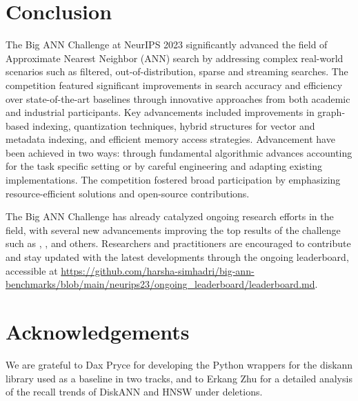 \section{Conclusion}
\label{sec:conclusion}

The Big ANN Challenge at NeurIPS 2023 significantly advanced the field of Approximate Nearest Neighbor (ANN) search by addressing complex real-world scenarios such as filtered, out-of-distribution, sparse and streaming searches. The competition featured significant improvements in search accuracy and efficiency over state-of-the-art baselines through innovative approaches from both academic and industrial participants. 
Key advancements included improvements in graph-based indexing, quantization techniques, hybrid structures for vector and metadata indexing, and efficient memory access strategies. 
Advancement have been achieved in two ways: through fundamental algorithmic advances accounting for the task specific setting or by careful engineering and adapting existing implementations.
The competition fostered broad participation by emphasizing resource-efficient solutions and open-source contributions.





The Big ANN Challenge has already catalyzed ongoing research efforts in the field, with several new advancements improving the top results of the challenge such as \cite{bruch2024efficient}, \cite{pinecone_blog}, \cite{DBLP:journals/pvldb/ChenZHJW24} and others. Researchers and practitioners are encouraged to contribute and stay updated with the latest developments through the ongoing leaderboard, accessible at \url{https://github.com/harsha-simhadri/big-ann-benchmarks/blob/main/neurips23/ongoing_leaderboard/leaderboard.md}.

\section{Acknowledgements}
We are grateful to Dax Pryce for developing the Python wrappers for the diskann library used as a baseline in two tracks,
and to Erkang Zhu for a detailed analysis of the recall trends of DiskANN and HNSW under deletions.
